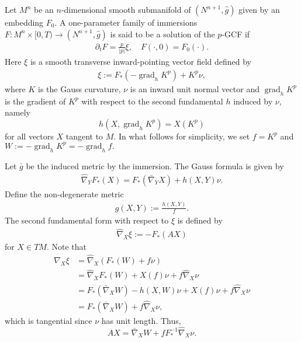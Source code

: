 \documentclass{amsart}
\theoremstyle{definition}
\theoremstyle{remark}
\numberwithin{equation}{section}
\begin{document}
\title[]
 {}

\curraddr{}
\email{}
\date{\today}

\dedicatory{}
\subjclass[2010]{}
\keywords{}

\begin{abstract}

\end{abstract}

\maketitle
Let $M^n$ be an $n$-dimensional smooth submanifold of $(N^{n+1},\hat{g})$ given by an embedding $F_0.$ A one-parameter family of immersions $F\colon M^n\times [0,T)\to (N^{n+1},\hat{g})$ is said to be a solution of the $ p $-GCF if
\begin{align}
\partial_tF=\frac{p}{|p|}\xi,\quad F(\cdot,0)=F_0(\cdot).
\end{align}
Here $\xi $ is a smooth transverse inward-pointing vector field defined by
\begin{align}
\xi:=F_{\ast}(-\operatorname{grad}_hK^p)+ K ^{ p }\nu,
\end{align}
where $ K $ is the Gauss curvature, $\nu$ is an inward unit normal vector and $\operatorname{grad}_hK^{p}$ is the gradient of $K^{p}$ with respect to the second fundamental $h$ induced by $\nu,$ namely
\[
h(X, \operatorname{grad}_h K^p) = X(K^p)
\]
for all vectors $X$ tangent to $M$. In what follows for simplicity, we set $ f = K ^{ p }$ and $W:=-\operatorname{grad}_hK^{p} = - \operatorname{grad}_h f.$

Let $\bar{g}$ be the induced metric by the immersion. The Gauss formula is given by
\begin{align}\label{gauss equ}
\hat{\nabla}_YF_{\ast}(X)=F_{\ast}(\bar{\nabla}_YX)+h(X,Y)\nu.
\end{align}
Define the non-degenerate metric
\begin{align}
g(X,Y):=\frac{h(X,Y)}{ f }.
\end{align}
The second fundamental form with respect to $\xi$ is defined by
\begin{align}
\hat{\nabla}_X\xi:=-F_{\ast}(AX)
\end{align}
for $X\in TM$. Note that
\begin{align*}
\hat{\nabla}_X \xi &= \hat{\nabla}_X (F_{\ast}(W) + f \nu) \\
&= \hat{\nabla}_X F_{\ast}(W) + X(f)\nu + f \hat{\nabla}_X \nu \\
&= F_{\ast}(\bar{\nabla}_X W) - h(X, W) \nu + X(f) \nu + f \hat{\nabla}_X \nu \\
&= F_{\ast} (\bar{\nabla}_X W) + f \hat{\nabla}_X \nu,
\end{align*}
which is tangential since $\nu$ has unit length. Thus,
\[
AX = \bar{\nabla}_X W + f F_{\ast}^{-1} \hat{\nabla}_X \nu.
\]
\end{document}
